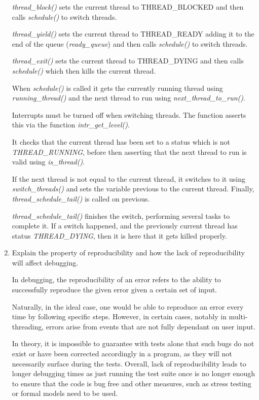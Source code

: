 \documentclass[11pt]{article}
\begin{document}
\begin{enumerate}
\emph{thread\_block()} sets the current thread to THREAD\_BLOCKED and then calls
\emph{schedule()} to switch threads.

\emph{thread\_yield()} sets the current thread to THREAD\_READY adding it to the
end of the queue (\emph{ready\_queue}) and then calls \emph{schedule()} to switch
threads.

\emph{thread\_exit()} sets the current thread to THREAD\_DYING and then calls
\emph{schedule()} which then kills the current thread.

When \emph{schedule()} is called it gets the currently running thread using
\emph{running\_thread()} and the next thread to run using
\emph{next\_thread\_to\_run()}.

Interrupts must be turned off when switching threads. The function asserts this
via the function \emph{intr\_get\_level()}.

It checks that the current thread has been set to a status which is not
\emph{THREAD\_RUNNING}, before then asserting that the next thread to run is
valid using \emph{is\_thread()}.

If the next thread is not equal to the current thread, it switches to it using
\emph{switch\_threads()} and sets the variable previous to the current
thread. Finally, \emph{thread\_schedule\_tail()} is called on previous.

\emph{thread\_schedule\_tail()} finishes the switch, performing several tasks to
complete it. If a switch happened, and the previously current thread has status
\emph{THREAD\_DYING}, then it is here that it gets killed properly.

\item Explain the property of reproducibility and how the lack of
reproducibility will affect debugging.

In debugging, the reproducibility of an error refers to the ability to
successfully reproduce the given error given a certain set of input.

Naturally, in the ideal case, one would be able to reproduce an error every time
by following specific steps. However, in certain cases, notably in
multi-threading, errors arise from events that are not fully dependant on user
input.

In theory, it is impossible to guarantee with tests alone that such bugs do not
exist or have been corrected accordingly in a program, as they will not
necessarily surface during the tests. Overall, lack of reproducibility leads to
longer debugging times as just running the test suite once is no longer enough
to ensure that the code is bug free and other measures, such as stress testing
or formal models need to be used.


\end{enumerate}
\end{document}
